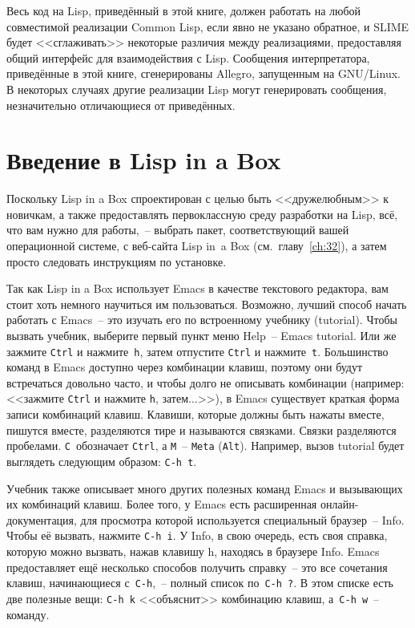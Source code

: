 Весь код на Lisp, приведённый в этой книге, должен работать на любой совместимой
реализации Common Lisp, если явно не указано обратное, и SLIME будет <<сглаживать>>
некоторые различия между реализациями, предоставляя общий интерфейс для взаимодействия с
Lisp. Сообщения интерпретатора, приведённые в этой книге, сгенерированы Allegro,
запущенным на GNU/Linux. В некоторых случаях другие реализации Lisp могут
генерировать сообщения, незначительно отличающиеся от приведённых.

\section{Введение в Lisp in a Box}

Поскольку Lisp in a Box спроектирован с целью быть <<дружелюбным>> к новичкам, а
также предоставлять первоклассную среду разработки на Lisp, всё, что вам нужно для
работы,~-- выбрать пакет, соответствующий вашей операционной системе, с веб-сайта
Lisp in~a Box (см.~главу~\ref{ch:32}), а затем просто следовать инструкциям
по установке.

Так как Lisp in a Box использует Emacs в качестве текстового редактора, вам стоит хоть
немного научиться им пользоваться. Возможно, лучший способ начать работать с Emacs~-- это
изучать его по встроенному учебнику (tutorial). Чтобы вызвать учебник, выберите первый
пункт меню Help~-- Emacs tutorial. Или же зажмите \texttt{Ctrl} и нажмите~\texttt{h}, затем отпустите \texttt{Ctrl} и
нажмите~\texttt{t}. Большинство команд в Emacs доступно через комбинации клавиш, поэтому они будут
встречаться довольно часто, и чтобы долго не описывать комбинации (например: <<зажмите \texttt{Ctrl}
и нажмите \texttt{h}, затем...>>), в Emacs существует краткая форма записи комбинаций
клавиш. Клавиши, которые должны быть нажаты вместе, пишутся вместе, разделяются тире и
называются связками.  Связки разделяются пробелами. \texttt{C}~обозначает \texttt{Ctrl}, а \texttt{M}~-- \texttt{Meta}
(\texttt{Alt}). Например, вызов tutorial будет выглядеть следующим образом: \texttt{C-h t}.

Учебник также описывает много других полезных команд Emacs и вызывающих их комбинаций
клавиш. Более того, у Emacs есть расширенная онлайн-документация, для просмотра которой
используется специальный браузер~-- Info. Чтобы её вызвать, нажмите \texttt{C-h i}. У Info,
в свою очередь, есть своя справка, которую можно вызвать, нажав клавишу h, находясь в браузере Info. Emacs
предоставляет ещё несколько способов получить справку~-- это все сочетания клавиш,
начинающиеся с~\texttt{C-h},~-- полный список по~\texttt{C-h ?}. В этом списке есть две
полезные вещи: \texttt{C-h k} <<объяснит>> комбинацию клавиш, а~\texttt{C-h w}~-- команду.

